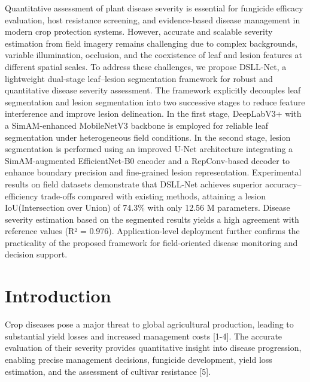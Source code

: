 \documentclass[
]{article}
\begin{document}
Quantitative assessment of plant disease severity is essential for
fungicide efficacy evaluation, host resistance screening, and
evidence-based disease management in modern crop protection systems.
However, accurate and scalable severity estimation from field imagery
remains challenging due to complex backgrounds, variable illumination,
occlusion, and the coexistence of leaf and lesion features at different
spatial scales. To address these challenges, we propose DSLL-Net, a
lightweight dual-stage leaf--lesion segmentation framework for robust
and quantitative disease severity assessment. The framework explicitly
decouples leaf segmentation and lesion segmentation into two successive
stages to reduce feature interference and improve lesion delineation. In
the first stage, DeepLabV3+ with a SimAM-enhanced MobileNetV3 backbone
is employed for reliable leaf segmentation under heterogeneous field
conditions. In the second stage, lesion segmentation is performed using
an improved U-Net architecture integrating a SimAM-augmented
EfficientNet-B0 encoder and a RepConv-based decoder to enhance boundary
precision and fine-grained lesion representation. Experimental results
on field datasets demonstrate that DSLL-Net achieves superior
accuracy--efficiency trade-offs compared with existing methods,
attaining a lesion IoU(Intersection over Union) of 74.3\% with only
12.56 M parameters. Disease severity estimation based on the segmented
results yields a high agreement with reference values (R² = 0.976).
Application-level deployment further confirms the practicality of the
proposed framework for field-oriented disease monitoring and decision
support.

\hypertarget{introduction}{%
\section{Introduction}\label{introduction}}

Crop diseases pose a major threat to global agricultural production,
leading to substantial yield losses and increased management costs
{[}1-4{]}. The accurate evaluation of their severity provides
quantitative insight into disease progression, enabling precise
management decisions, fungicide development, yield loss estimation, and
the assessment of cultivar resistance {[}5{]}.
\end{document}
